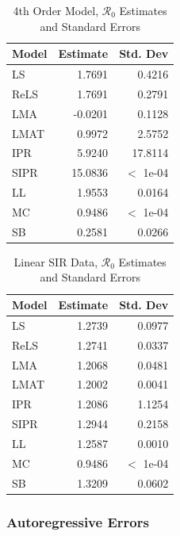 \documentclass[12pt]{article}
\newcommand{\rr}{\ensuremath{\mathcal{R}_0}}
\begin{document}
\begin{table}[H]
	
	
	\centering
	\begin{tabular}[t]{l|r|r}
		\hline
		Model & Estimate & Std. Dev\\
		\hline
		LS & 1.7691 & 0.4216\\
		\hline
		ReLS & 1.7691 & 0.2791\\
		\hline
		LMA & -0.0201 & 0.1128\\
		\hline
		LMAT & 0.9972 & 2.5752\\
		\hline
		IPR & 5.9240 & 17.8114\\
		\hline
		SIPR & 15.0836 & $<$ 1e-04\\
		\hline
		LL & 1.9553 & 0.0164\\
		\hline
		MC & 0.9486 & $<$ 1e-04\\
		\hline
		SB & 0.2581 & 0.0266\\
		\hline
	\end{tabular}
	\caption{4th Order Model, $\rr$ Estimates and Standard Errors}
\end{table}


\begin{table}[H]
	
	\centering
	\begin{tabular}[t]{l|r|r}
		\hline
		Model & Estimate & Std. Dev\\
		\hline
		LS & 1.2739 & 0.0977\\
		\hline
		ReLS & 1.2741 & 0.0337\\
		\hline
		LMA & 1.2068 & 0.0481\\
		\hline
		LMAT & 1.2002 & 0.0041\\
		\hline
		IPR & 1.2086 & 1.1254\\
		\hline
		SIPR & 1.2944 & 0.2158\\
		\hline
		LL & 1.2587 & 0.0010\\
		\hline
		MC & 0.9486 & $<$ 1e-04\\
		\hline
		SB & 1.3209 & 0.0602\\
		\hline
	\end{tabular}
	\caption{Linear SIR Data, $\rr$ Estimates and Standard Errors}
\end{table}



\subsubsection{Autoregressive Errors}
\end{document}
